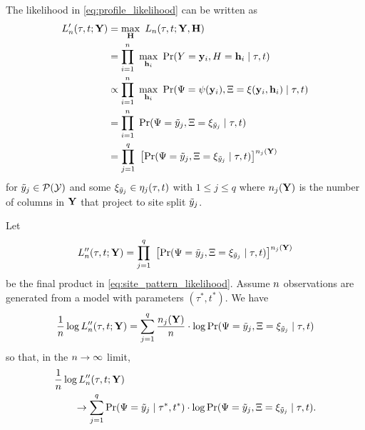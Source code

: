 The likelihood in \eqref{eq:profile_likelihood} can be written as
\begin{align}
L_\nCols'(\tau, t; \fullAlignment) &= \max_{\fullAncestralStates} \ L_\nCols(\tau, t; \fullAlignment, \fullAncestralStates) \nonumber \\
                             &= \prod_{i=1}^{\nCols} \ \max_{\ancestralStateColumn_i} \ \Pr(\alignmentColumnRV=\alignmentColumn_i, \ancestralStateColumnRV=\ancestralStateColumn_i \mid \tau, t) \nonumber \\
                             &\propto \prod_{i=1}^{\nCols} \ \max_{\ancestralStateColumn_i} \ \Pr(\siteSplitRV=\patternToSplit(\alignmentColumn_i), \ancestralSplitRV=\ancestralToSplit(\alignmentColumn_i, \ancestralStateColumn_i) \mid \tau, t) \nonumber \\
                             &= \prod_{i=1}^{\nCols} \ \Pr(\siteSplitRV=\siteSplit_j, \ancestralSplitRV=\xi_{\siteSplit_j} \mid \tau, t) \nonumber \\
                             &= \prod_{j=1}^{\nSiteSplits} \ \left[\Pr(\siteSplitRV=\siteSplit_j, \ancestralSplitRV=\xi_{\siteSplit_j} \mid \tau, t)\right] ^{\nCols_j(\fullAlignment)} \label{eq:site_pattern_likelihood}
\end{align}
for $\tilde{y}_j\in\mathcal{P}(\mathcal{Y})$ and some $\xi_{\tilde{y}_j}\in\eta_j(\tau, t)$ with $1 \le j \le q$ where $n_j(\mathbf{Y})$ is the number of columns in $\mathbf{Y}$ that project to site split $\tilde{y}_j$.

Let
\[
L_n''(\tau, t; \mathbf{Y}) = \prod_{j=1}^{q} \ \left[\Pr(\Psi=\tilde{y}_j, \Xi=\xi_{\tilde{y}_j} \mid \tau, t)\right] ^{n_j(\mathbf{Y})}
\]
be the final product in \eqref{eq:site_pattern_likelihood}.
Assume $n$ observations are generated from a model with parameters $(\tau^*, t^*)$.
We have
\begin{equation*}
\frac{1}{n} \log L_n''(\tau, t; \mathbf{Y}) = \sum_{j=1}^q \frac{n_j(\mathbf{Y})}{n}\cdot  \log \Pr(\Psi=\tilde{y}_j, \Xi=\xi_{\tilde{y}_j} \mid \tau, t)
\end{equation*}
so that, in the $n\rightarrow\infty$ limit,
\begin{equation}
\begin{split}
&    \frac{1}{n} \log L_n''(\tau, t; \mathbf{Y}) \\
&\qquad \rightarrow \sum_{j=1}^q \Pr(\Psi=\tilde{y}_j \mid \tau^*, t^*) \cdot \log \Pr(\Psi=\tilde{y}_j, \Xi=\xi_{\tilde{y}_j} \mid \tau, t). \label{eq:site_pattern_profile_likelihood_mean}
\end{split}
\end{equation}

